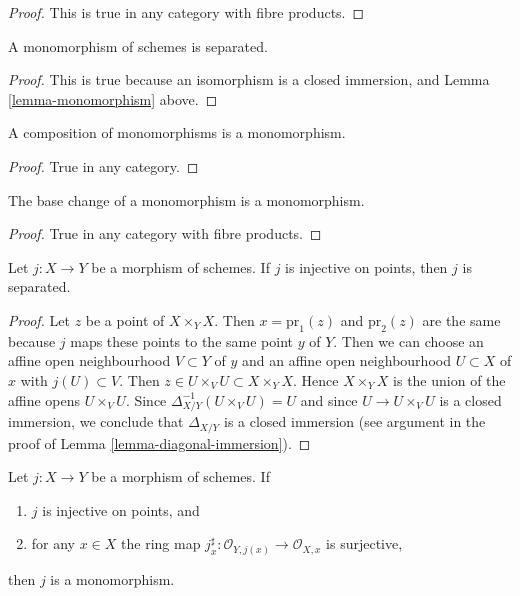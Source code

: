 \begin{proof}
This is true in any category with fibre products.
\end{proof}

\begin{lemma}
\label{lemma-monomorphism-separated}
A monomorphism of schemes is separated.
\end{lemma}

\begin{proof}
This is true because an isomorphism is a closed immersion,
and Lemma \ref{lemma-monomorphism} above.
\end{proof}

\begin{lemma}
\label{lemma-composition-monomorphism}
A composition of monomorphisms is a monomorphism.
\end{lemma}

\begin{proof}
True in any category.
\end{proof}

\begin{lemma}
\label{lemma-base-change-monomorphism}
The base change of a monomorphism is a monomorphism.
\end{lemma}

\begin{proof}
True in any category with fibre products.
\end{proof}

\begin{lemma}
\label{lemma-injective-points}
Let $j : X \to Y$ be a morphism of schemes.
If $j$ is injective on points, then $j$ is separated.
\end{lemma}

\begin{proof}
Let $z$ be a point of $X \times_Y X$. Then $x = \text{pr}_1(z)$ and
$\text{pr}_2(z)$ are the same because $j$ maps these points to
the same point $y$ of $Y$. Then we can choose an affine
open neighbourhood $V \subset Y$ of $y$ and an affine open
neighbourhood $U \subset X$ of $x$ with $j(U) \subset V$.
Then $z \in U \times_V U \subset X \times_Y X$.
Hence $X \times_Y X$ is the union of the affine
opens $U \times_V U$. Since $\Delta_{X/Y}^{-1}(U \times_V U) = U$
and since $U \to U \times_V U$ is a closed immersion, we conclude
that $\Delta_{X/Y}$ is a closed immersion (see argument in the
proof of Lemma \ref{lemma-diagonal-immersion}).
\end{proof}

\begin{lemma}
\label{lemma-injective-points-surjective-stalks}
Let $j : X \to Y$ be a morphism of schemes.
If
\begin{enumerate}
\item $j$ is injective on points, and
\item for any $x \in X$ the ring map
$j^\sharp_x : \mathcal{O}_{Y, j(x)} \to \mathcal{O}_{X, x}$
is surjective,
\end{enumerate}
then $j$ is a monomorphism.
\end{lemma}

